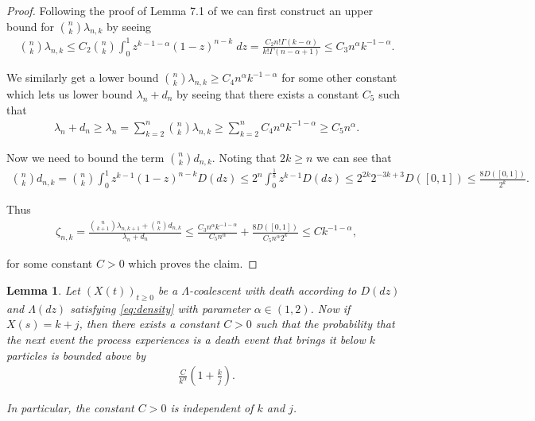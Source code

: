 \documentclass[11pt]{article}
\newtheorem{lemma}{Lemma}
\theoremstyle{definition}
\begin{document}
\begin{proof}
    Following the proof of Lemma 7.1 of \cite{betasmalltime} we can first construct an upper bound for $\binom{n}{k}\lambda_{n,k}$ by seeing
    \begin{align*}
        \binom{n}{k}\lambda_{n,k} \leq C_2\binom{n}{k}\int_0^1 z^{k-1-\alpha}(1-z)^{n-k}\;dz = \frac{C_2n!\Gamma(k- \alpha)}{k!\Gamma(n-\alpha+1)}\leq C_3n^\alpha k^{-1-\alpha}.
    \end{align*}

    \noindent We similarly get a lower bound $\binom{n}{k}\lambda_{n,k} \geq C_4n^\alpha k^{-1-\alpha}$ for some other constant which lets us lower bound $\lambda_n + d_n$ by seeing that there exists a constant $C_5$ such that
    \begin{align*}
        \lambda_n + d_n \geq \lambda_n = \sum_{k = 2}^n \binom{n}{k}\lambda_{n,k} \geq \sum_{k = 2}^n C_4n^\alpha k^{-1-\alpha} \geq C_5n^\alpha.
    \end{align*}

    \noindent Now we need to bound the term $\binom{n}{k}d_{n,k}$. Noting that $2k \geq n$ we can see that
    \begin{align*}
        \binom{n}{k}d_{n,k} = \binom{n}{k}\int_0^1 z^{k-1}(1-z)^{n-k}D(dz) \leq 2^n \int_0^{\frac{1}{8}} z^{k-1}D(dz) \leq 2^{2k} 2^{-3k+3}D([0,1]) \leq \frac{8D([0,1])}{2^k}.
    \end{align*}
    
    \noindent Thus 
    \begin{align*}
        \zeta_{n,k} = \frac{\binom{n}{k+1} \lambda_{n,k+1} + \binom{n}{k}d_{n,k}}{\lambda_n + d_n} \leq \frac{C_3n^\alpha k^{-1-\alpha} }{C_5n^\alpha} + \frac{8D([0,1])}{C_5n^{\alpha}2^k} \leq Ck^{-1-\alpha},
    \end{align*}

    \noindent for some constant $C > 0$ which proves the claim.
\end{proof}

\begin{lemma}\label{L:largedeath}
    Let $(X(t))_{t \geq 0}$ be a $\Lambda$-coalescent with death according to $D(dz)$ and $\Lambda(dz)$ satisfying \eqref{eq:density} with parameter $\alpha \in (1,2)$. Now if $X(s) = k+j$, then there exists a constant $C > 0$ such that the probability that the next event the process experiences is a death event that brings it below $k$ particles is bounded above by
    \begin{align*}
        \frac{C}{k^\alpha}\left(1 + \frac{k}{j} \right).
    \end{align*}

    \noindent In particular, the constant $C > 0$ is independent of $k$ and $j$.
\end{lemma}
\end{document}
